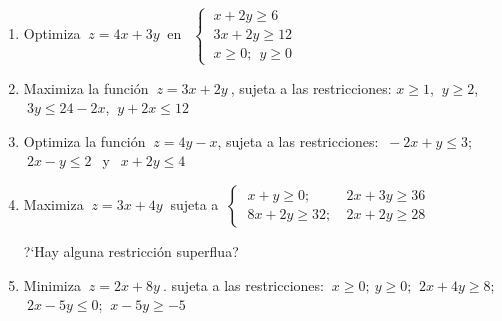 \begin{adjustwidth}{20pt}{10pt}
\begin{enumerate}[PB. 1. ]
\item Optimiza $\ z=4x+3y\ $ en $\ \ \begin{cases} \ x+2y\ge 6 \\ \ 3x+2y\ge 12 \\ \ x\ge 0;\ \ y\ge 0 \end{cases}$

\hspace{-15mm}\vspace{1cm}



\item Maximiza la función $\ z = 3x + 2y\ $, sujeta a las restricciones: $x \ge 1 $, $\ y \ge 2$, $\ 3y \le 24 - 2x$, $ \ y + 2x \le 12$

\hspace{-15mm}\vspace{1cm}


\item  Optimiza la función $\ z=4y-x$, sujeta a las restricciones: $\ - 2x + y \le 3$; $\  2x - y \le  2 \ \ $  y $\ \   x + 2 y \le  4$


\hspace{-15mm}\vspace{1cm}

\item Maximiza $\ z=3x+4y\ $ sujeta a  $\ \begin{cases} \ x+y\ge 0; & \ 2x+3y\ge 36 \\ \ 8x+2y\ge 32; & \ 2x+2y \ge 28 \end{cases}$

?`Hay alguna restricción superflua?

\hspace{-15mm}\vspace{1cm}


\item Minimiza $\ z=2x+8y\ $. sujeta a las restricciones: $\ x\ge 0; \ y\ge 0$; $\ 2x+4y\ge 8$; $\ 2x-5y\le 0$; $\ x-5y\ge -5$

\hspace{-15mm}\vspace{1cm}




\end{enumerate}
\end{adjustwidth}
